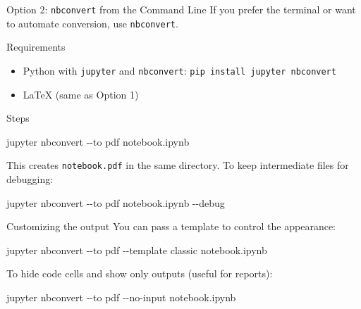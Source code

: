 \documentclass[
  ignorenonframetext,
  aspectratio=169,
]{beamer}
\newenvironment{Shaded}{\begin{snugshade}}{\end{snugshade}}
\newcommand{\AttributeTok}[1]{\textcolor[rgb]{0.40,0.45,0.13}{#1}}
\newcommand{\ExtensionTok}[1]{\textcolor[rgb]{0.00,0.23,0.31}{#1}}
\newcommand{\NormalTok}[1]{\textcolor[rgb]{0.00,0.23,0.31}{#1}}
\providecommand{\tightlist}{%
  \setlength{\itemsep}{0pt}\setlength{\parskip}{0pt}}
\begin{document}
\begin{frame}[fragile]{Option 2: \texttt{nbconvert} from the Command
Line}
\protect{}\label{option-2-nbconvert-from-the-command-line}
If you prefer the terminal or want to automate conversion, use
\texttt{nbconvert}.

\begin{block}{Requirements}
\protect{}\label{requirements-1}
\begin{itemize}
\tightlist
\item
  Python with \texttt{jupyter} and \texttt{nbconvert}:
  \texttt{pip\ install\ jupyter\ nbconvert}
\item
  LaTeX (same as Option 1)
\end{itemize}
\end{block}

\begin{block}{Steps}
\protect{}\label{steps-1}
\begin{Shaded}
\begin{Highlighting}[]
\ExtensionTok{jupyter}\NormalTok{ nbconvert }\AttributeTok{{-}{-}to}\NormalTok{ pdf notebook.ipynb}
\end{Highlighting}
\end{Shaded}

This creates \texttt{notebook.pdf} in the same directory. To keep
intermediate files for debugging:

\begin{Shaded}
\begin{Highlighting}[]
\ExtensionTok{jupyter}\NormalTok{ nbconvert }\AttributeTok{{-}{-}to}\NormalTok{ pdf notebook.ipynb }\AttributeTok{{-}{-}debug}
\end{Highlighting}
\end{Shaded}
\end{block}

\begin{block}{Customizing the output}
\protect{}\label{customizing-the-output}
You can pass a template to control the appearance:

\begin{Shaded}
\begin{Highlighting}[]
\ExtensionTok{jupyter}\NormalTok{ nbconvert }\AttributeTok{{-}{-}to}\NormalTok{ pdf }\AttributeTok{{-}{-}template}\NormalTok{ classic notebook.ipynb}
\end{Highlighting}
\end{Shaded}

To hide code cells and show only outputs (useful for reports):

\begin{Shaded}
\begin{Highlighting}[]
\ExtensionTok{jupyter}\NormalTok{ nbconvert }\AttributeTok{{-}{-}to}\NormalTok{ pdf }\AttributeTok{{-}{-}no{-}input}\NormalTok{ notebook.ipynb}
\end{Highlighting}
\end{Shaded}
\end{block}
\end{frame}
\end{document}
